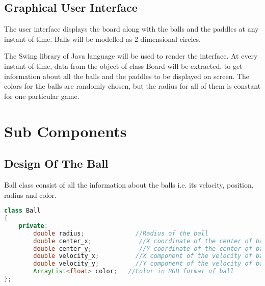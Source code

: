 \documentclass{article}
\begin{document}
    	\subsection{Graphical User Interface}
    	The user interface displays the board along with the balls and the paddles at any instant of time. Balls will be modelled as 2-dimensional circles.
    	\par\noindent The Swing library of Java language will be used to render the interface. At every instant of time, data from the object of class Board will be extracted, to get information about all the balls and the paddles to be displayed on screen. The colors for the balls are randomly chosen, but the radius for all of them is constant for one particular game. 


	\section{Sub Components}
\subsection{Design Of The Ball} Ball class consist of all the information about the balls i.e. its velocity, position, radius and color.


\begin{lstlisting}[language=Java, caption={Class Parameters for Ball}]
class Ball
{
	private:
		double radius;              //Radius of the ball
		double center_x;             //X coordinate of the center of ball
		double center_y;             //Y coordinate of the center of ball
		double velocity_x;          //X component of the velocity of ball
		double velocity_y;          //Y component of the velocity of ball
		ArrayList<float> color;   //Color in RGB format of ball
};

\end{lstlisting}
\end{document}
